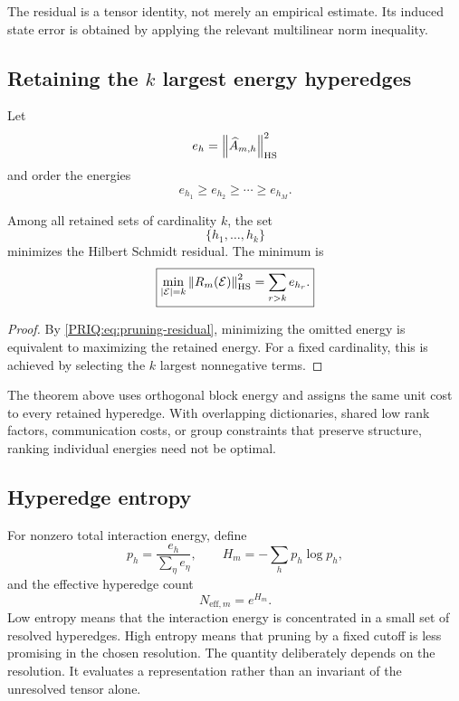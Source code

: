 The residual is a tensor identity, not merely an empirical estimate.  Its induced state error is obtained by applying the relevant multilinear norm inequality.

\subsection{\texorpdfstring{Retaining the $k$ largest energy hyperedges}{Retaining the k largest energy hyperedges}}
Let
\[
  e_h=\left\lVert \widehat A_{m,h}\right\rVert_{\mathrm{HS}}^2
\]
and order the energies
\[
  e_{h_1}\geq e_{h_2}\geq\cdots\geq e_{h_M}.
\]

\begin{PRIQtheorem}\label{PRIQ:thm:best-k-hyperedges}
Among all retained sets of cardinality $k$, the set
\[
  \{h_1,\ldots,h_k\}
\]
minimizes the Hilbert Schmidt residual.  The minimum is
\begin{equation}\label{PRIQ:eq:best-k-residual}
  \boxed{
  \min_{|\mathcal E|=k}
  \left\lVert R_m(\mathcal E)\right\rVert_{\mathrm{HS}}^2
  =
  \sum_{r>k}e_{h_r}.}
\end{equation}
\end{PRIQtheorem}

\begin{proof}
By \eqref{PRIQ:eq:pruning-residual}, minimizing the omitted energy is equivalent to maximizing the retained energy.  For a fixed cardinality, this is achieved by selecting the $k$ largest nonnegative terms.
\end{proof}

\begin{PRIQboundary}
The theorem above uses orthogonal block energy and assigns the same unit cost to every retained hyperedge.  With overlapping dictionaries, shared low rank factors, communication costs, or group constraints that preserve structure, ranking individual energies need not be optimal.
\end{PRIQboundary}

\subsection{Hyperedge entropy}
For nonzero total interaction energy, define
\[
  p_h=\frac{e_h}{\sum_{\eta}e_{\eta}},
  \qquad
  H_m=-\sum_hp_h\log p_h,
\]
and the effective hyperedge count
\[
  N_{\mathrm{eff},m}=e^{H_m}.
\]
Low entropy means that the interaction energy is concentrated in a small set of resolved hyperedges.  High entropy means that pruning by a fixed cutoff is less promising in the chosen resolution.  The quantity deliberately depends on the resolution.  It evaluates a representation rather than an invariant of the unresolved tensor alone.

